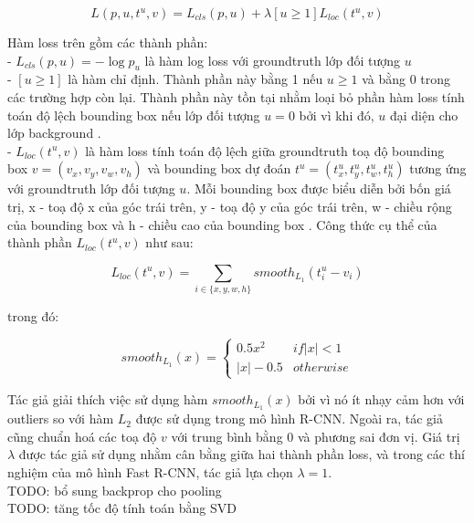 {    \begin{equation}
        \label{eq:fast_rcnn_loss}
        L(p, u, t^u, v) = L_{cls}(p, u) + \lambda [u \ge 1] L_{loc}(t^u, v)
    \end{equation}

    \noindent
    Hàm loss trên gồm các thành phần: \\
    -  $L_{cls}(p, u) = -\log p_u$ là hàm log loss với groundtruth  lớp đối tượng  $u$ \\
    -  $[u \ge 1]$ là hàm chỉ định. Thành phần này bằng 1 nếu $u \ge 1$ và bằng 0 trong các trường hợp còn lại. Thành phần này tồn tại nhằm loại bỏ phần hàm loss tính toán độ lệch bounding box  nếu lớp đối tượng  $u = 0$ bởi vì khi đó, $u$ đại diện cho lớp background . \\
    -  $L_{loc}(t^u, v)$ là hàm loss tính toán độ lệch giữa groundtruth  toạ độ bounding box  $v = (v_{x}, v_{y}, v_{w}, v_{h})$ và bounding box  dự đoán $t^u = (t^u_{x}, t^u_{y}, t^u_{w}, t^u_{h})$ tương ứng với groundtruth  lớp đối tượng  $u$. Mỗi bounding box  được biểu diễn bởi bốn giá trị, x - toạ độ x của góc trái trên, y - toạ độ y của góc trái trên, w - chiều rộng của bounding box  và h - chiều cao của bounding box .
    Công thức cụ thể của thành phần $L_{loc}(t^u, v)$ như sau:

    \begin{equation}
        \label{eq:fast_rcnn_bb_loss}
        L_{loc}(t^u, v) = \sum_{i \in \{{x},{y},{w},{h}\}} {smooth}_{L_1}(t^u_i - v_i)
    \end{equation}

    \noindent
    trong đó:

    \begin{equation}
        \label{eq:fast_rcnn_bb_loss_l1}
        {smooth}_{L_1}(x) =
        \begin{cases}
            0.5x^2& {if} |x| < 1 \\
            |x| - 0.5& {otherwise}
        \end{cases}
    \end{equation}

    \noindent
    Tác giả giải thích việc sử dụng hàm ${smooth}_{L_1}(x)$ bởi vì nó ít nhạy cảm hơn với outliers so với hàm ${L_2}$ được sử dụng trong mô hình R-CNN.
    Ngoài ra, tác giả cũng chuẩn hoá các toạ độ $v$ với trung bình bằng 0 và phương sai đơn vị.
    Giá trị $\lambda$ được tác giả sử dụng nhằm cân bằng giữa hai thành phần loss, và trong các thí nghiệm của mô hình Fast R-CNN, tác giả lựa chọn $\lambda = 1$. \\
    TODO: bổ sung backprop cho pooling \\
    TODO: tăng tốc độ tính toán bằng SVD

}
